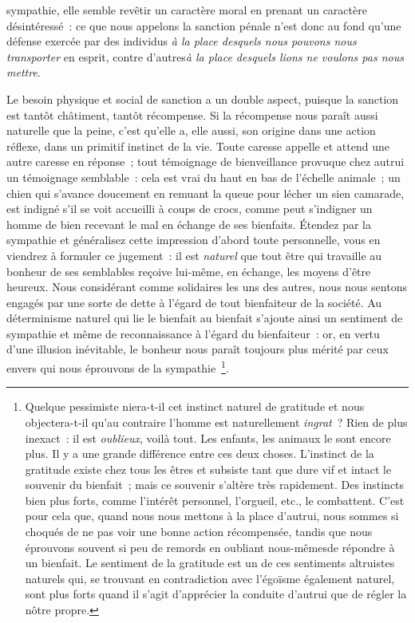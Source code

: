 \documentclass[french,twoside]{book} %
\begin{document}
sympathie, elle semble revêtir un caractère moral en prenant un caractère désintéressé : ce que nous appelons la sanction pénale n’est donc au fond qu’une défense exercée par des individus \emph{à la place desquels nous pouvons nous transporter} en esprit, contre d’autres\emph{à la place desquels lions ne voulons pas nous mettre}.\par
Le besoin physique et social de sanction a un double aspect, puisque la sanction est tantôt châtiment, tantôt récompense. Si la récompense nous paraît aussi naturelle que la peine, c’est qu’elle a, elle aussi, son origine dans une action réflexe, dans un primitif instinct de la vie. Toute caresse appelle et attend une autre caresse en réponse ; tout témoignage de bienveillance provuque chez autrui un témoignage semblable : cela est vrai du haut en bas de l’échelle animale ; un chien qui s’avance doucement en remuant la queue pour lécher un sien camarade, est indigné s’il se voit accueilli à coups de crocs, comme peut s’indigner un homme de bien recevant le mal en échange de ses bienfaits. Étendez par la sympathie et généralisez cette impression d’abord toute personnelle, vous en viendrez à formuler ce jugement : il est \emph{naturel} que tout être qui travaille au bonheur de ses semblables reçoive lui-même, en échange, les moyens d’être heureux. Nous considérant comme solidaires les uns des autres, nous nous sentons engagés par une sorte de dette à l’égard de tout bienfaiteur de la société. Au déterminisme naturel qui lie le bienfait au bienfait s’ajoute ainsi un sentiment de sympathie et même de reconnaissance à l’égard du bienfaiteur : or, en vertu d’une illusion inévitable, le bonheur nous paraît toujours plus mérité par ceux envers qui nous éprouvons de la sympathie \footnote{Quelque pessimiste niera-t-il cet instinct naturel de gratitude et nous objectera-t-il qu’au contraire l’homme est naturellement \emph{ingrat} ? Rien de plus inexact : il est \emph{oublieux}, voilà tout. Les enfants, les animaux le sont encore plus. Il y a une grande différence entre ces deux choses. L’instinct de la gratitude existe chez tous les êtres et subsiste tant que dure vif et intact le souvenir du bienfait ; mais ce souvenir s’altère très rapidement. Des instincts bien plus forts, comme l’intérêt personnel, l’orgueil, etc., le combattent. C’est pour cela que, quand nous nous mettons à la place d’autrui, nous sommes si choqués de ne pas voir une bonne action récompensée, tandis que nous éprouvons souvent si peu de remords en oubliant nous-mêmesde répondre à un bienfait. Le sentiment de la gratitude est un de ces sentiments altruistes naturels qui, se trouvant en contradiction avec l’égoïsme également naturel, sont plus forts quand il s’agit d’apprécier la conduite d’autrui que de régler la nôtre propre.}.\par
\end{document}
